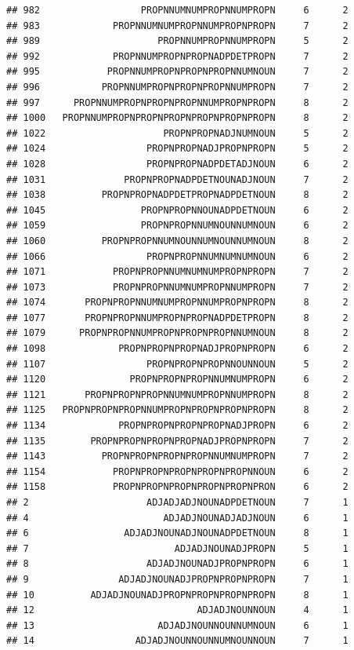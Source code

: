 \documentclass[]{article}
\begin{document}
\begin{verbatim}
## 982                  PROPNNUMNUMPROPNNUMPROPN     6      2
## 983             PROPNNUMNUMPROPNNUMPROPNPROPN     7      2
## 989                     PROPNNUMPROPNNUMPROPN     5      2
## 992             PROPNNUMPROPNPROPNADPDETPROPN     7      2
## 995            PROPNNUMPROPNPROPNPROPNNUMNOUN     7      2
## 996           PROPNNUMPROPNPROPNPROPNNUMPROPN     7      2
## 997      PROPNNUMPROPNPROPNPROPNNUMPROPNPROPN     8      2
## 1000   PROPNNUMPROPNPROPNPROPNPROPNPROPNPROPN     8      2
## 1022                     PROPNPROPNADJNUMNOUN     5      2
## 1024                  PROPNPROPNADJPROPNPROPN     5      2
## 1028                  PROPNPROPNADPDETADJNOUN     6      2
## 1031              PROPNPROPNADPDETNOUNADJNOUN     7      2
## 1038          PROPNPROPNADPDETPROPNADPDETNOUN     8      2
## 1045                 PROPNPROPNNOUNADPDETNOUN     6      2
## 1059                 PROPNPROPNNUMNOUNNUMNOUN     6      2
## 1060          PROPNPROPNNUMNOUNNUMNOUNNUMNOUN     8      2
## 1066                  PROPNPROPNNUMNUMNUMNOUN     6      2
## 1071            PROPNPROPNNUMNUMNUMPROPNPROPN     7      2
## 1073            PROPNPROPNNUMNUMPROPNNUMPROPN     7      2
## 1074       PROPNPROPNNUMNUMPROPNNUMPROPNPROPN     8      2
## 1077       PROPNPROPNNUMPROPNPROPNADPDETPROPN     8      2
## 1079      PROPNPROPNNUMPROPNPROPNPROPNNUMNOUN     8      2
## 1098             PROPNPROPNPROPNADJPROPNPROPN     6      2
## 1107                  PROPNPROPNPROPNNOUNNOUN     5      2
## 1120               PROPNPROPNPROPNNUMNUMPROPN     6      2
## 1121       PROPNPROPNPROPNNUMNUMPROPNNUMPROPN     8      2
## 1125   PROPNPROPNPROPNNUMPROPNPROPNPROPNPROPN     8      2
## 1134             PROPNPROPNPROPNPROPNADJPROPN     6      2
## 1135        PROPNPROPNPROPNPROPNADJPROPNPROPN     7      2
## 1143          PROPNPROPNPROPNPROPNNUMNUMPROPN     7      2
## 1154            PROPNPROPNPROPNPROPNPROPNNOUN     6      2
## 1158            PROPNPROPNPROPNPROPNPROPNPRON     6      2
## 2                     ADJADJADJNOUNADPDETNOUN     7      1
## 4                        ADJADJNOUNADJADJNOUN     6      1
## 6                 ADJADJNOUNADJNOUNADPDETNOUN     8      1
## 7                          ADJADJNOUNADJPROPN     5      1
## 8                     ADJADJNOUNADJPROPNPROPN     6      1
## 9                ADJADJNOUNADJPROPNPROPNPROPN     7      1
## 10          ADJADJNOUNADJPROPNPROPNPROPNPROPN     8      1
## 12                             ADJADJNOUNNOUN     4      1
## 13                      ADJADJNOUNNOUNNUMNOUN     6      1
## 14                  ADJADJNOUNNOUNNUMNOUNNOUN     7      1

\end{verbatim}
\end{document}
